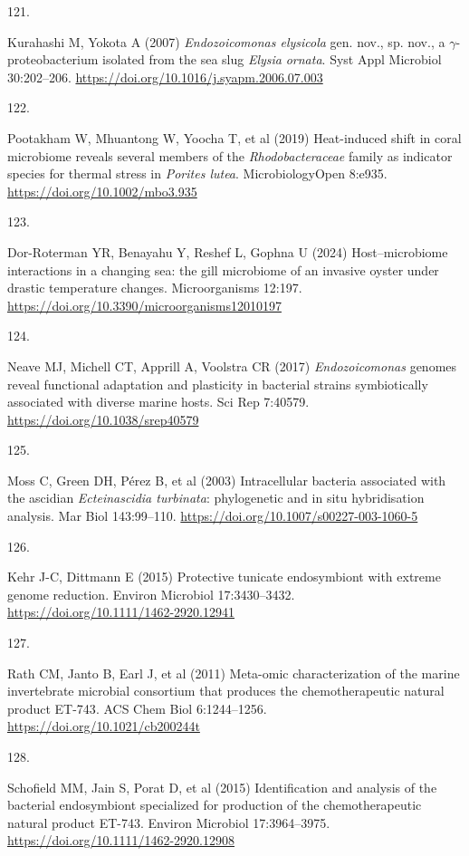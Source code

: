 \documentclass[
  12 pt,
]{article}
\newlength{\cslhangindent}
\newlength{\csllabelwidth}
\newenvironment{CSLReferences}[2] %
 {\begin{list}{}{%
  \setlength{\itemindent}{0pt}
  \setlength{\leftmargin}{0pt}
  \setlength{\parsep}{0pt}
  \ifodd #1
   \setlength{\leftmargin}{\cslhangindent}
   \setlength{\itemindent}{-1\cslhangindent}
  \fi
  \setlength{\itemsep}{#2\baselineskip}}}
 {\end{list}}
\newcommand{\CSLLeftMargin}[1]{\parbox[t]{\csllabelwidth}{\strut#1\strut}}
\newcommand{\CSLRightInline}[1]{\parbox[t]{\linewidth - \csllabelwidth}{\strut#1\strut}}
\begin{document}
\begin{CSLReferences}{0}{0}
\CSLLeftMargin{121. }%
\CSLRightInline{Kurahashi M, Yokota A (2007) {\emph{Endozoicomonas elysicola}} gen. nov., sp. nov., a \(\gamma\)-proteobacterium isolated from the sea slug {{\emph{Elysia}}}{\emph{ ornata}}. Syst Appl Microbiol 30:202--206. \url{https://doi.org/10.1016/j.syapm.2006.07.003}}

\CSLLeftMargin{122. }%
\CSLRightInline{Pootakham W, Mhuantong W, Yoocha T, et al (2019) Heat-induced shift in coral microbiome reveals several members of the {\emph{Rhodobacteraceae}} family as indicator species for thermal stress in {\emph{Porites lutea}}. MicrobiologyOpen 8:e935. \url{https://doi.org/10.1002/mbo3.935}}

\CSLLeftMargin{123. }%
\CSLRightInline{Dor-Roterman YR, Benayahu Y, Reshef L, Gophna U (2024) Host--microbiome interactions in a changing sea: the gill microbiome of an invasive oyster under drastic temperature changes. Microorganisms 12:197. \url{https://doi.org/10.3390/microorganisms12010197}}

\CSLLeftMargin{124. }%
\CSLRightInline{Neave MJ, Michell CT, Apprill A, Voolstra CR (2017) {\emph{Endozoicomonas}} genomes reveal functional adaptation and plasticity in bacterial strains symbiotically associated with diverse marine hosts. Sci Rep 7:40579. \url{https://doi.org/10.1038/srep40579}}

\CSLLeftMargin{125. }%
\CSLRightInline{Moss C, Green DH, Pérez B, et al (2003) Intracellular bacteria associated with the ascidian {{\emph{Ecteinascidia turbinata}}}: phylogenetic and in situ hybridisation analysis. Mar Biol 143:99--110. \url{https://doi.org/10.1007/s00227-003-1060-5}}

\CSLLeftMargin{126. }%
\CSLRightInline{Kehr J-C, Dittmann E (2015) Protective tunicate endosymbiont with extreme genome reduction. Environ Microbiol 17:3430--3432. \url{https://doi.org/10.1111/1462-2920.12941}}

\CSLLeftMargin{127. }%
\CSLRightInline{Rath CM, Janto B, Earl J, et al (2011) Meta-omic characterization of the marine invertebrate microbial consortium that produces the chemotherapeutic natural product {ET-743}. ACS Chem Biol 6:1244--1256. \url{https://doi.org/10.1021/cb200244t}}

\CSLLeftMargin{128. }%
\CSLRightInline{Schofield MM, Jain S, Porat D, et al (2015) Identification and analysis of the bacterial endosymbiont specialized for production of the chemotherapeutic natural product {ET-743}. Environ Microbiol 17:3964--3975. \url{https://doi.org/10.1111/1462-2920.12908}}


\end{CSLReferences}
\end{document}
